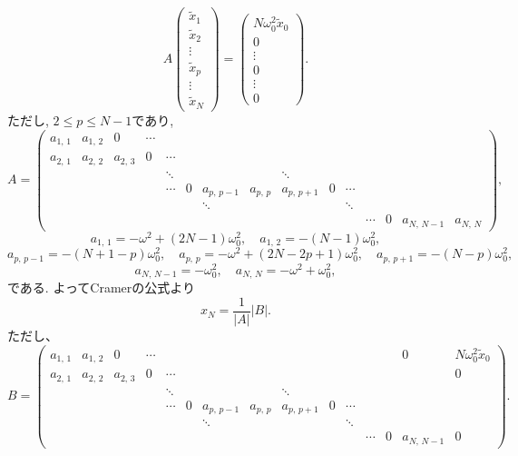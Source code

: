 \begin{equation}
A
\begin{pmatrix}
\tilde{x}_1\\
\tilde{x}_2\\
\vdots\\
\tilde{x}_p\\
\vdots\\
\tilde{x}_N
\end{pmatrix}
=
\begin{pmatrix}
N\omega_0^2\tilde{x}_0\\
0\\
\vdots\\
0\\
\vdots\\
0
\end{pmatrix}.
\end{equation}
ただし, $2\leq p\leq N-1$であり, 
\begin{equation}
A=
\begin{pmatrix}
a_{1,\,1}&a_{1,\,2}&0&\cdots&\\
a_{2,\,1}&a_{2,\,2}&a_{2,\,3}&0&\cdots&\\
&&&&\ddots&&&&\ddots\\
&&&&\cdots&0&a_{p,\,p-1}&a_{p,\,p}&a_{p,\,p+1}&0&\cdots&\\
&&&&&&\ddots&&&&\ddots\\
&&&&&&&&&&&\cdots&0&a_{N,\,N-1}&a_{N,\,N}
\end{pmatrix},
\end{equation}
\begin{equation}
a_{1,\,1}=-\omega^2+(2N-1)\omega_0^2,\quad a_{1,\,2}=-(N-1)\omega_0^2,
\label{eq3.21}
\end{equation}
\begin{equation}
a_{p,\,p-1}=-(N+1-p)\omega_0^2,\quad a_{p,\,p}=-\omega^2+(2N-2p+1)\omega_0^2,\quad a_{p,\,p+1}=-(N-p)\omega_0^2,
\label{eq3.22}
\end{equation}
\begin{equation}
a_{N,\,N-1}=-\omega_0^2,\quad a_{N,\,N}=-\omega^2+\omega_0^2,
\label{eq3.23}
\end{equation}
である. よってCramerの公式より
\begin{equation}
x_N=\frac{1}{|A|}|B|.
\end{equation}
ただし、
\begin{equation}
B=
\begin{pmatrix}
a_{1,\,1}&a_{1,\,2}&0&\cdots&&&&&&&&&&0&N\omega_0^2\tilde{x}_0\\
a_{2,\,1}&a_{2,\,2}&a_{2,\,3}&0&\cdots&&&&&&&&&&0\\
&&&&\ddots&&&&\ddots\\
&&&&\cdots&0&a_{p,\,p-1}&a_{p,\,p}&a_{p,\,p+1}&0&\cdots&\\
&&&&&&\ddots&&&&\ddots\\
&&&&&&&&&&&\cdots&0&a_{N,\,N-1}&0
\end{pmatrix}.
\end{equation}
